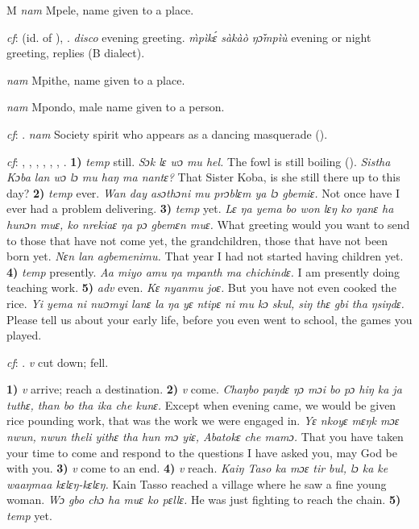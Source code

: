 \begin{letter}{M}
 \textit{nam} Mpele, name given to a place.

 \textit{cf}:  (id. of ), . \textit{disco} evening greeting. \textit{\`{m}pìkɛ́ sàkàò ŋɔ̌mpìù} evening or night greeting, replies (B dialect). 

 \textit{nam} Mpithe, name given to a place.

 \textit{nam} Mpondo, male name given to a person. 

 \textit{cf}: . \textit{nam} Society spirit who appears as a dancing masquerade (\citealt{Pichl1967}).

 \textit{cf}: , , , , , , . \textbf{1)} \textit{temp} still. \textit{Sɔk lɛ wɔ mu hel.} The fowl is still boiling (\citealt{Pichl1967}). \textit{Sistha Kɔba lan wɔ lɔ mu haŋ ma nantɛ?} That Sister Koba, is she still there up to this day? \textbf{2)} \textit{temp} ever. \textit{Wan day asɔthɔni mu prɔblɛm ya lɔ gbemiɛ.} Not once have I ever had a problem delivering. \textbf{3)} \textit{temp} yet. \textit{Lɛ ŋa yema bo won lɛŋ ko ŋanɛ ha hunɔn muɛ, ko nrekiaɛ ŋa pɔ gbemɛn muɛ.} What greeting would you want to send to those that have not come yet, the grandchildren, those that have not been born yet. \textit{Nɛn lan agbemenimu.} That year I had not started having children yet. \textbf{4)} \textit{temp} presently. \textit{Aa miyo amu ŋa mpanth ma chichindɛ.} I am presently doing teaching work. \textbf{5)} \textit{adv} even. \textit{Kɛ nyanmu joɛ.} But you have not even cooked the rice. \textit{Yi yema ni nwɔmyi lanɛ la ŋa yɛ ntipɛ ni mu kɔ skul, siŋ thɛ gbi tha ŋsiŋdɛ.} Please tell us about your early life, before you even went to school, the games you played.

 \textit{cf}: . \textit{v} cut down; fell.

 \textbf{1)} \textit{v} arrive; reach a destination. \textbf{2)} \textit{v} come. \textit{Chaŋbo paŋdɛ ŋɔ mɔi bo pɔ hiŋ ka ja tuthɛ, than bo tha ika che kunɛ.} Except when evening came, we would be given rice pounding work, that was the work we were engaged in. \textit{Yɛ nkoyɛ mɛŋk mɔɛ nwun, nwun theli yithɛ tha hun mɔ yiɛ, Abatokɛ che mamɔ.} That you have taken your time to come and respond to the questions I have asked you, may God be with you. \textbf{3)} \textit{v} come to an end. \textbf{4)} \textit{v} reach. \textit{Kaiŋ Taso ka mɔɛ tir bul, lɔ ka ke waaŋmaa kɛlɛŋ-kɛlɛŋ.} Kain Tasso reached a village where he saw a fine young woman. \textit{Wɔ gbo chɔ ha muɛ ko pɛllɛ.} He was just fighting to reach the chain. \textbf{5)} \textit{temp} yet.


\end{letter}
